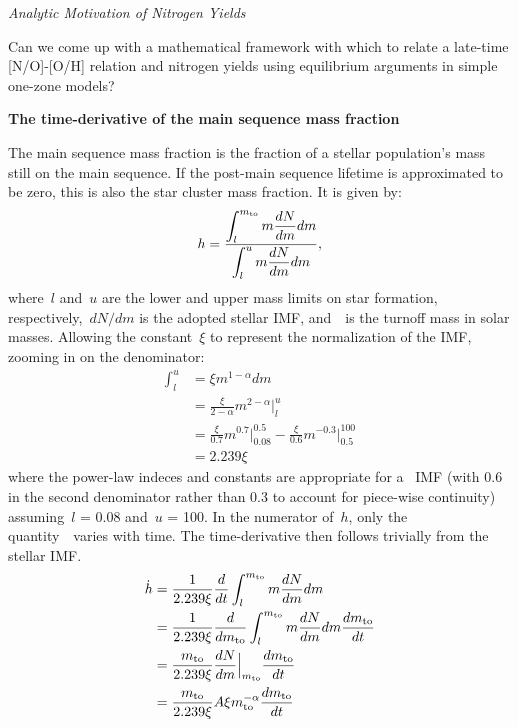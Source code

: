 \documentclass[\main/notes.tex]{subfiles}
\begin{document}
\twolineskip 
\null 
\twolineskip 
{\Large \textit{Analytic Motivation of Nitrogen Yields}} 
\par\noindent 
Can we come up with a mathematical framework with which to relate a late-time 
[N/O]-[O/H] relation and nitrogen yields using equilibrium arguments in simple 
one-zone models? 
\par 
\textbf{The time-derivative of the main sequence mass fraction} 
\par\noindent 
The main sequence mass fraction is the fraction of a stellar population's mass 
still on the main sequence. 
If the post-main sequence lifetime is approximated to be zero, this is also the 
star cluster mass fraction. 
It is given by: 
\begin{equation} 
h = \frac{\displaystyle 
	\int_l^{m_\text{to}} m\frac{dN}{dm} dm  
}{\displaystyle 
	\int_l^u m\frac{dN}{dm} dm 
} , 
\end{equation}
where~$l$ and~$u$ are the lower and upper mass limits on star formation, 
respectively,~$dN/dm$ is the adopted stellar IMF, and~\mto~is the turnoff mass 
in solar masses. 
Allowing the constant~$\xi$ to represent the normalization of the IMF, zooming 
in on the denominator: 
\begin{subequations}\begin{align} 
\int_l^u &= \xi m^{1 - \alpha} dm \\ 
&= \frac{\xi}{2 - \alpha} m^{2 - \alpha}\Big|_l^u \\ 
&= \frac{\xi}{0.7}m^{0.7}\Big|_{0.08}^{0.5} - 
\frac{\xi}{0.6}m^{-0.3}\Big|_{0.5}^{100} \\ 
&= 2.239\xi 
\end{align}\end{subequations} 
where the power-law indeces and constants are appropriate for 
a~\citet{Kroupa2001} IMF (with 0.6 in the second denominator rather than 0.3 
to account for piece-wise continuity) assuming~$l$ = 0.08 and~$u$ = 100. 
In the numerator of~$h$, only the quantity~\mto~varies with time. 
The time-derivative then follows trivially from the stellar IMF. 
\begin{subequations}\begin{align} 
\dot{h} &= \frac{1}{2.239\xi} \frac{d}{dt} 
\int_l^{m_\text{to}} m \frac{dN}{dm} dm 
\\ 
&= \frac{1}{2.239\xi} \frac{d}{dm_\text{to}} 
\int_l^{m_\text{to}} m \frac{dN}{dm} dm \frac{dm_\text{to}}{dt} 
\\ 
&= \frac{m_\text{to}}{2.239\xi} \frac{dN}{dm} \Big|_{m_\text{to}} \frac{dm_\text{to}}{dt} 
\\ 
&= \frac{m_\text{to}}{2.239\xi} A\xi m_\text{to}^{-\alpha} \frac{dm_\text{to}}{dt} 
\end{align}\end{subequations} 
\end{document}
